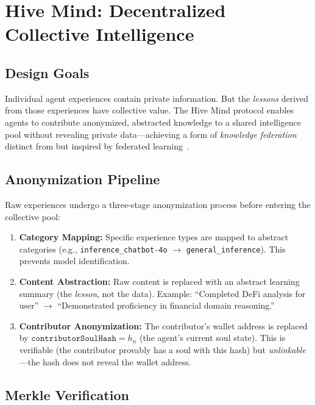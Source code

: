 \documentclass[10pt,a4paper]{article}
\theoremstyle{definition}
\theoremstyle{plain}
\begin{document}
\section{Hive Mind: Decentralized Collective Intelligence}
\label{sec:hivemind}

\subsection{Design Goals}

Individual agent experiences contain private information. But the \emph{lessons} derived from those experiences have collective value. The Hive Mind protocol enables agents to contribute anonymized, abstracted knowledge to a shared intelligence pool without revealing private data---achieving a form of \emph{knowledge federation} distinct from but inspired by federated learning~\cite{fl-blockchain2024, fl-privacy2024}.

\subsection{Anonymization Pipeline}

Raw experiences undergo a three-stage anonymization process before entering the collective pool:

\begin{enumerate}[leftmargin=1.8em, itemsep=2pt, parsep=0pt]
  \item \textbf{Category Mapping:} Specific experience types are mapped to abstract categories (e.g., \texttt{inference\_chatbot-4o} $\to$ \texttt{general\_inference}). This prevents model identification.
  \item \textbf{Content Abstraction:} Raw content is replaced with an abstract learning summary (the \emph{lesson}, not the data). Example: ``Completed DeFi analysis for user'' $\to$ ``Demonstrated proficiency in financial domain reasoning.''
  \item \textbf{Contributor Anonymization:} The contributor's wallet address is replaced by $\texttt{contributorSoulHash} = h_n$ (the agent's current soul state). This is verifiable (the contributor provably has a soul with this hash) but \emph{unlinkable}---the hash does not reveal the wallet address.
\end{enumerate}

\subsection{Merkle Verification}
\end{document}
